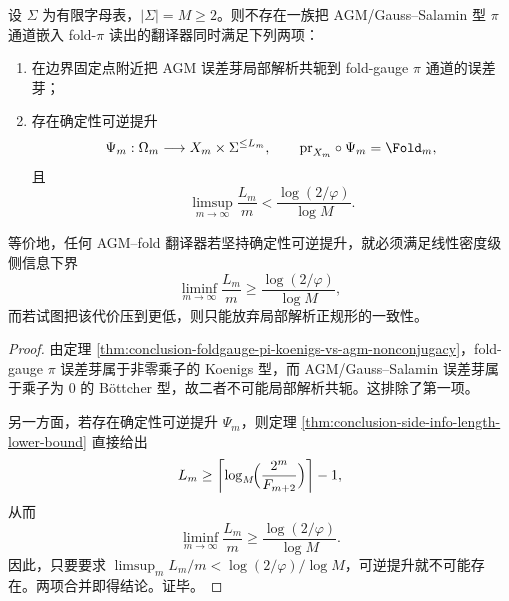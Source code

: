 \begin{theorem}\label{thm:conclusion-foldgauge-pi-agm-translator-dichotomy}
设 \(\Sigma\) 为有限字母表，\(|\Sigma|=M\ge 2\)。则不存在一族把 AGM/Gauss--Salamin 型 \(\pi\) 通道嵌入 fold-\(\pi\) 读出的翻译器同时满足下列两项：
\begin{enumerate}
  \item 在边界固定点附近把 AGM 误差芽局部解析共轭到 fold-gauge \(\pi\) 通道的误差芽；
  \item 存在确定性可逆提升
  \[
  \Psi_m:\Omega_m\longrightarrow X_m\times \Sigma^{\le L_m},
  \qquad
  \mathrm{pr}_{X_m}\circ \Psi_m=\Fold_m,
  \]
  且
  \[
  \limsup_{m\to\infty}\frac{L_m}{m}
  <
  \frac{\log(2/\varphi)}{\log M}.
  \]
\end{enumerate}
等价地，任何 AGM--fold 翻译器若坚持确定性可逆提升，就必须满足线性密度级侧信息下界
\[
\liminf_{m\to\infty}\frac{L_m}{m}
\ge
\frac{\log(2/\varphi)}{\log M},
\]
而若试图把该代价压到更低，则只能放弃局部解析正规形的一致性。
\end{theorem}
\begin{proof}
由定理 \ref{thm:conclusion-foldgauge-pi-koenigs-vs-agm-nonconjugacy}，fold-gauge \(\pi\) 误差芽属于非零乘子的 Koenigs 型，而 AGM/Gauss--Salamin 误差芽属于乘子为 \(0\) 的 B\"ottcher 型，故二者不可能局部解析共轭。这排除了第一项。

另一方面，若存在确定性可逆提升 \(\Psi_m\)，则定理 \ref{thm:conclusion-side-info-length-lower-bound} 直接给出
\[
L_m\ge \left\lceil \log_M\!\Bigl(\frac{2^m}{F_{m+2}}\Bigr)\right\rceil-1,
\]
从而
\[
\liminf_{m\to\infty}\frac{L_m}{m}
\ge
\frac{\log(2/\varphi)}{\log M}.
\]
因此，只要要求 \(\limsup_m L_m/m<\log(2/\varphi)/\log M\)，可逆提升就不可能存在。两项合并即得结论。证毕。
\end{proof}

